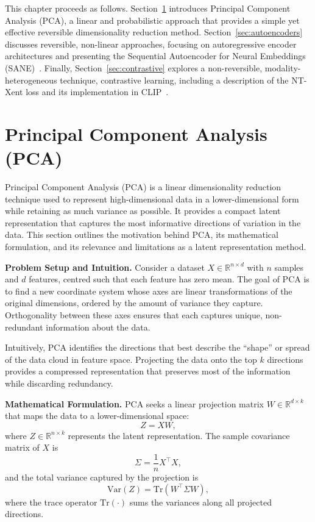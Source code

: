 This chapter proceeds as follows. Section~\ref{sec:pca} introduces Principal Component Analysis (PCA), a linear and probabilistic approach that provides a simple yet effective reversible dimensionality reduction method. Section~\ref{sec:autoencoders} discusses reversible, non-linear approaches, focusing on autoregressive encoder architectures and presenting the Sequential Autoencoder for Neural Embeddings (SANE)~\cite{}. Finally, Section~\ref{sec:contrastive} explores a non-reversible, modality-heterogeneous technique, contrastive learning, including a description of the NT-Xent loss and its implementation in CLIP~\cite{}.

\section{Principal Component Analysis (PCA)}
\label{sec:pca}

Principal Component Analysis (PCA) is a linear dimensionality reduction technique used to represent high-dimensional data in a lower-dimensional form while retaining as much variance as possible. It provides a compact latent representation that captures the most informative directions of variation in the data. This section outlines the motivation behind PCA, its mathematical formulation, and its relevance and limitations as a latent representation method.

\vspace{0.5em}
\noindent
\textbf{Problem Setup and Intuition.}
Consider a dataset \( X \in \mathbb{R}^{n \times d} \) with \( n \) samples and \( d \) features, centred such that each feature has zero mean. The goal of PCA is to find a new coordinate system whose axes are linear transformations of the original dimensions, ordered by the amount of variance they capture. Orthogonality between these axes ensures that each captures unique, non-redundant information about the data.

Intuitively, PCA identifies the directions that best describe the “shape” or spread of the data cloud in feature space. Projecting the data onto the top \( k \) directions provides a compressed representation that preserves most of the information while discarding redundancy.

\vspace{0.5em}
\noindent
\textbf{Mathematical Formulation.}
PCA seeks a linear projection matrix \( W \in \mathbb{R}^{d \times k} \) that maps the data to a lower-dimensional space:
\[
Z = XW,
\]
where \( Z \in \mathbb{R}^{n \times k} \) represents the latent representation.  
The sample covariance matrix of \( X \) is
\[
\Sigma = \frac{1}{n} X^\top X,
\]
and the total variance captured by the projection is
\[
\text{Var}(Z) = \text{Tr}(W^\top \Sigma W),
\]
where the trace operator \( \text{Tr}(\cdot) \) sums the variances along all projected directions.  

